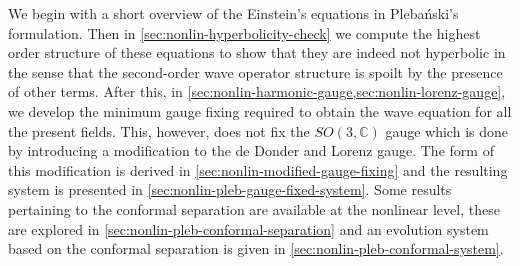 \documentclass[10pt]{report}
\newcommand{\pleb}[0]{Pleba\'nski}
\theoremstyle{definition}
\newcommand{\C}[0]{\mathbb{C}}
\begin{document}
        We begin with a short overview of the Einstein's equations in \pleb{}'s formulation. Then in \cref{sec:nonlin-hyperbolicity-check} we compute the highest order structure of these equations to show that they are indeed not hyperbolic in the sense that the second-order wave operator structure is spoilt by the presence of other terms. After this, in \cref{sec:nonlin-harmonic-gauge,sec:nonlin-lorenz-gauge}, we develop the minimum gauge fixing required to obtain the wave equation for all the present fields. This, however, does not fix the $SO(3,\C)$ gauge which is done by introducing a modification to the de Donder and Lorenz gauge. The form of this modification is derived in \cref{sec:nonlin-modified-gauge-fixing} and the resulting system is presented in \cref{sec:nonlin-pleb-gauge-fixed-system}. Some results pertaining to the conformal separation are available at the nonlinear level, these are explored in \cref{sec:nonlin-pleb-conformal-separation} and an evolution system based on the conformal separation is given in \cref{sec:nonlin-pleb-conformal-system}.
        
\end{document}
